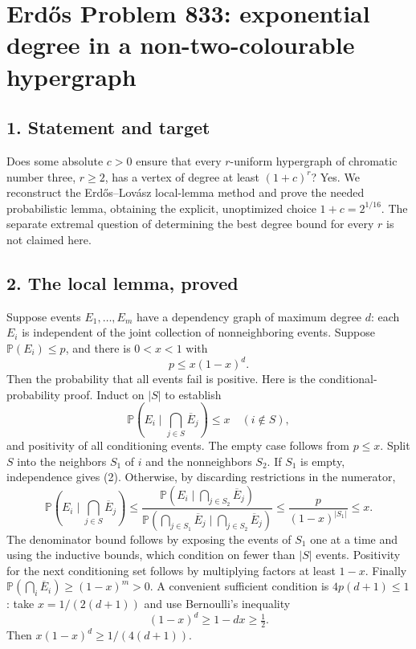 \section*{Erd\H{o}s Problem 833: exponential degree in a non-two-colourable hypergraph}
\subsection*{1. Statement and target}
Does some absolute $c>0$ ensure that every $r$-uniform hypergraph of chromatic number three, $r\ge2$, has a vertex of degree at least $(1+c)^r$? Yes. We reconstruct the Erd\H{o}s--Lov\'asz local-lemma method and prove the needed probabilistic lemma, obtaining the explicit, unoptimized choice $1+c=2^{1/16}$. The separate extremal question of determining the best degree bound for every $r$ is not claimed here.
\subsection*{2. The local lemma, proved}
Suppose events $E_1,\ldots,E_m$ have a dependency graph of maximum degree $d$: each $E_i$ is independent of the joint collection of nonneighboring events. Suppose $\mathbb P(E_i)\le p$, and there is $0<x<1$ with
\[
 p\le x(1-x)^d.                                           \tag{1}
\]
Then the probability that all events fail is positive.
Here is the conditional-probability proof. Induct on $|S|$ to establish
\[
 \mathbb P\left(E_i\mid\bigcap_{j\in S}\overline E_j\right)\le x
 \quad(i\notin S),                                       \tag{2}
\]
and positivity of all conditioning events. The empty case follows from $p\le x$. Split $S$ into the neighbors $S_1$ of $i$ and the nonneighbors $S_2$. If $S_1$ is empty, independence gives (2). Otherwise, by discarding restrictions in the numerator,
\[
 \mathbb P\left(E_i\mid\bigcap_{j\in S}\overline E_j\right)
 \le\frac{\mathbb P(E_i\mid\bigcap_{j\in S_2}\overline E_j)}
 {\mathbb P(\bigcap_{j\in S_1}\overline E_j\mid\bigcap_{j\in S_2}\overline E_j)}
 \le\frac p{(1-x)^{|S_1|}}\le x.
\]
The denominator bound follows by exposing the events of $S_1$ one at a time and using the inductive bounds, which condition on fewer than $|S|$ events. Positivity for the next conditioning set follows by multiplying factors at least $1-x$. Finally $\mathbb P(\bigcap_i\overline E_i)\ge(1-x)^m>0$.
A convenient sufficient condition is $4p(d+1)\le1$: take $x=1/(2(d+1))$ and use Bernoulli's inequality
\[
 (1-x)^d\ge1-dx\ge\tfrac12.
\]
Then $x(1-x)^d\ge1/(4(d+1))$.
